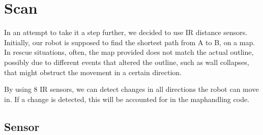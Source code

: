 \chapter{Scan}\label{ch:scan}
In an attempt to take it a step further, we decided to use IR
distance sensors. Initially, our robot is supposed to find the 
shortest path from A to B, on a map. 
In rescue situations, often, the map provided does not match the 
actual outline, possibly due to different events that altered
the outline, such as wall collapses, that might obstruct the
movement in a certain direction.

By using 8 IR sensors, we can detect changes in all directions 
the robot can move in. If a change is detected, this will be
accounted for in the maphandling code.

\section{Sensor}\label{sec:sensor}

